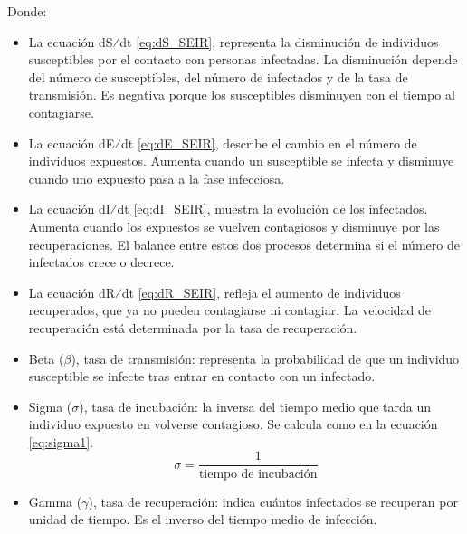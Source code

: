 Donde:
\begin{itemize}
    \item 	La ecuación dS⁄dt \eqref{eq:dS_SEIR}, representa la disminución de individuos susceptibles por el contacto con personas infectadas. La disminución depende del número de susceptibles, del número de infectados y de la tasa de transmisión. Es negativa porque los susceptibles disminuyen con el tiempo al contagiarse.
    \item 	La ecuación dE⁄dt \eqref{eq:dE_SEIR}, describe el cambio en el número de individuos expuestos. Aumenta cuando un susceptible se infecta y disminuye cuando uno expuesto pasa a la fase infecciosa.
    \item 	La ecuación dI⁄dt \eqref{eq:dI_SEIR}, muestra la evolución de los infectados. Aumenta cuando los expuestos se vuelven contagiosos y disminuye por las recuperaciones. El balance entre estos dos procesos determina si el número de infectados crece o decrece.
    \item 	La ecuación dR⁄dt \eqref{eq:dR_SEIR}, refleja el aumento de individuos recuperados, que ya no pueden contagiarse ni contagiar. La velocidad de recuperación está determinada por la tasa de recuperación.
    \item Beta ($\beta$), tasa de transmisión: representa la probabilidad de que un individuo susceptible se infecte tras entrar en contacto con un infectado. 
    \item Sigma ($\sigma$), tasa de incubación: la inversa del tiempo medio que tarda un individuo expuesto en volverse contagioso. Se calcula como en la ecuación \eqref{eq:sigma1}.
    \begin{equation}
    \sigma = \frac{1}{\text{tiempo de incubación}}
    \label{eq:sigma1}
    \end{equation}
    \item Gamma ($\gamma$), tasa de recuperación: indica cuántos infectados se recuperan por unidad de tiempo. Es el inverso del tiempo medio de infección.
\end{itemize}

 

